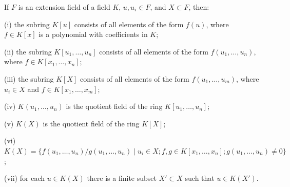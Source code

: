If $F$ is an extension field of a field $K$, $u, u_i \in F$, and $X \subset F$, then:

(i) the subring $K[u]$ consists of all elements of the form $f(u)$, where $f \in K[x]$ is a polynomial with coefficients in $K$;

(ii) the subring $K[u_1, \ldots, u_n]$ consists of all elements of the form $f(u_1, \ldots, u_n)$, where $f \in K[x_1, \ldots, x_n]$;

(iii) the subring $K[X]$ consists of all elements of the form $f(u_1, \ldots, u_m)$, where $u_i \in X$ and $f \in K[x_1, \ldots, x_m]$;

(iv) $K(u_1, \ldots, u_n)$ is the quotient field of the ring $K[u_1, \ldots, u_n]$;

(v) $K(X)$ is the quotient field of the ring $K[X]$;

(vi) $K(X) = \{f(u_1, \ldots, u_n)/g(u_1, \ldots, u_n) \mid u_i \in X; f,g \in K[x_1, \ldots, x_n]; g(u_1, \ldots, u_n) \neq 0\}$;

(vii) for each $u \in K(X)$ there is a finite subset $X' \subset X$ such that $u \in K(X')$.
